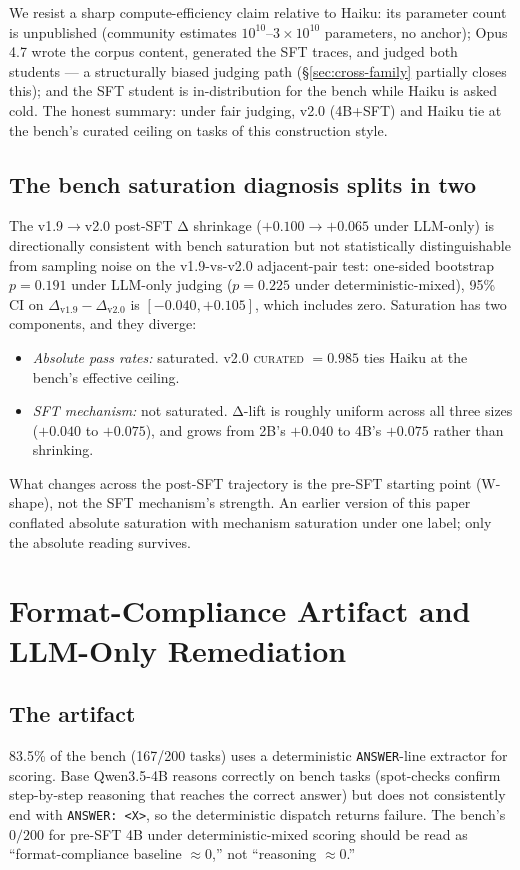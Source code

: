 \documentclass[10pt]{article}
\newcommand{\CU}{\textsc{curated}\xspace}
\newcommand{\Qwenf}{Qwen3.5-4B\xspace}
\begin{document}
We resist a sharp compute-efficiency claim relative to Haiku: its parameter count is unpublished (community estimates $10^{10}$--$3{\times}10^{10}$ parameters, no anchor); Opus 4.7 wrote the corpus content, generated the SFT traces, and judged both students --- a structurally biased judging path (\S\ref{sec:cross-family} partially closes this); and the SFT student is in-distribution for the bench while Haiku is asked cold. The honest summary: under fair judging, v2.0 (4B+SFT) and Haiku tie at the bench's curated ceiling on tasks of this construction style.

\subsection{The bench saturation diagnosis splits in two}\label{sec:saturation}
The v1.9$\to$v2.0 post-SFT Δ shrinkage ($+0.100 \to +0.065$ under LLM-only) is directionally consistent with bench saturation but not statistically distinguishable from sampling noise on the v1.9-vs-v2.0 adjacent-pair test: one-sided bootstrap $p = 0.191$ under LLM-only judging ($p = 0.225$ under deterministic-mixed), 95\% CI on $\Delta_{\mathrm{v1.9}} - \Delta_{\mathrm{v2.0}}$ is $[-0.040, +0.105]$, which includes zero. Saturation has two components, and they diverge:
\begin{itemize}[leftmargin=*, nosep]
  \item \emph{Absolute pass rates:} saturated. v2.0 \CU{} $= 0.985$ ties Haiku at the bench's effective ceiling.
  \item \emph{SFT mechanism:} not saturated. Δ-lift is roughly uniform across all three sizes ($+0.040$ to $+0.075$), and grows from 2B's $+0.040$ to 4B's $+0.075$ rather than shrinking.
\end{itemize}
What changes across the post-SFT trajectory is the pre-SFT starting point (W-shape), not the SFT mechanism's strength. An earlier version of this paper conflated absolute saturation with mechanism saturation under one label; only the absolute reading survives.

\section{Format-Compliance Artifact and LLM-Only Remediation}\label{sec:format-artifact}

\subsection{The artifact}
83.5\% of the bench (167/200 tasks) uses a deterministic \texttt{ANSWER}-line extractor for scoring. Base \Qwenf{} reasons correctly on bench tasks (spot-checks confirm step-by-step reasoning that reaches the correct answer) but does not consistently end with \texttt{ANSWER: <X>}, so the deterministic dispatch returns failure. The bench's $0/200$ for pre-SFT 4B under deterministic-mixed scoring should be read as ``format-compliance baseline $\approx 0$,'' not ``reasoning $\approx 0$.''
\end{document}
